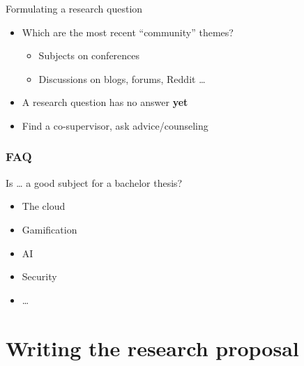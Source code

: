 \documentclass[aspectratio=169]{beamer}
\begin{document}
    \begin{frame}{Formulating a research question}
        
        \begin{itemize}
            \item Which are the most recent ``community'' themes?
            \begin{itemize}
                \item Subjects on conferences
                \item Discussions on blogs, forums, Reddit \ldots
            \end{itemize}
            \item A research question has no answer \textbf{yet} 
            \item Find a co-supervisor, ask advice/counseling
        \end{itemize}
        
    \end{frame}
    
    \begin{frame}[plain]
        \frametitle{FAQ}
        
        Is \ldots{} a good subject for a bachelor thesis?
        
        \begin{itemize}
            \item The cloud
            \item Gamification
            \item AI
            \item Security
            \item \ldots
        \end{itemize}
        
        \bigskip
        
    \end{frame}
    
    \section{Writing the research proposal}
    
\end{document}
